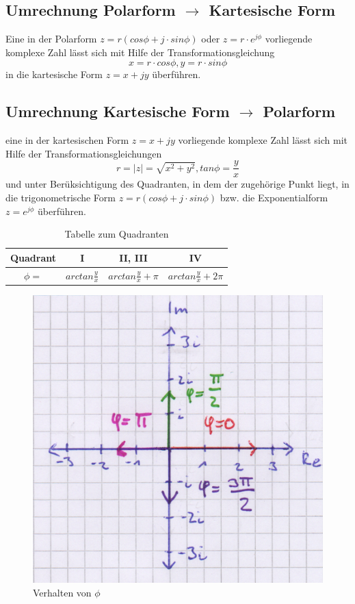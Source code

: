 \subsection{Umrechnung Polarform $\rightarrow$ Kartesische Form}
Eine in der Polarform $z = r (cos\phi + j \cdot sin\phi)$ oder $z=r \cdot e^{j\phi}$ vorliegende komplexe Zahl lässt sich mit Hilfe der Transformationsgleichung 
$$ x = r \cdot cos\phi, y = r \cdot sin\phi$$ 
in die kartesische Form $z = x + jy$ überführen.

\subsection{Umrechnung Kartesische Form $\rightarrow$ Polarform}
eine in der kartesischen Form $z = x + jy$ vorliegende komplexe Zahl lässt sich mit Hilfe der Transformationsgleichungen 
$$ r = |z| = \sqrt{x^2 + y^2}, tan \phi = \frac{y}{x}$$ 
und unter Berüksichtigung des Quadranten, in dem der zugehörige Punkt liegt, in die trigonometrische Form $z = r(cos\phi + j \cdot sin\phi)$ bzw. die Exponentialform $z=e^{j\phi}$ überführen.
\begin{table}[H]
\begin{tabular}{|c|c|c|c|}
\hline 
Quadrant & I & II, III & IV \\ 
\hline 
$\phi =$ & $arctan \frac{y}{x}$ & $arctan \frac{y}{x}+\pi$ & $arctan \frac{y}{x} + 2\pi$ \\ 
\hline 
\end{tabular}
\caption{Tabelle zum Quadranten}
\end{table} 

\begin{figure}[H]
\centering 
	\includegraphics[width=1\textwidth]{Bilder/phi}
\caption{Verhalten von $\phi$}
\end{figure} 


